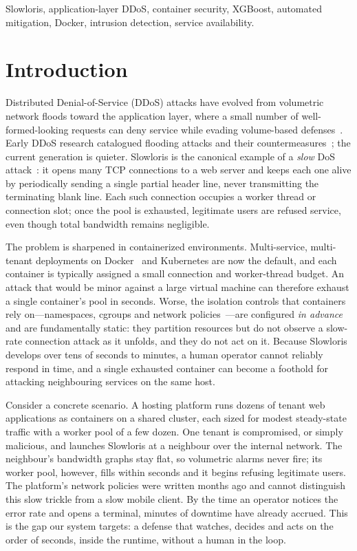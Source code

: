 \documentclass[conference]{IEEEtran}
\begin{document}
\begin{IEEEkeywords}
Slowloris, application-layer DDoS, container security, XGBoost, automated
mitigation, Docker, intrusion detection, service availability.
\end{IEEEkeywords}

\section{Introduction}
Distributed Denial-of-Service (DDoS) attacks have evolved from volumetric
network floods toward the application layer, where a small number of
well-formed-looking requests can deny service while evading volume-based
defenses~\cite{deressu2026survey,praseed2019survey,zargar2013survey}. Early DDoS
research catalogued flooding attacks and their
countermeasures~\cite{mirkovic2004taxonomy,zargar2013survey}; the current
generation is quieter. Slowloris is the canonical example of a \emph{slow} DoS
attack~\cite{cambiaso2013slow}: it opens many TCP connections to a web server
and keeps each one alive by periodically sending a single partial header line,
never transmitting the terminating blank line. Each such connection occupies a
worker thread or connection slot; once the pool is exhausted, legitimate users
are refused service, even though total bandwidth remains negligible.

The problem is sharpened in containerized environments. Multi-service,
multi-tenant deployments on Docker~\cite{merkel2014docker} and Kubernetes are now
the default, and each container is typically assigned a small connection and
worker-thread budget. An attack that would be minor against a large virtual
machine can therefore exhaust a single container's pool in seconds. Worse, the
isolation controls that containers rely on---namespaces, cgroups and network
policies~\cite{k8s_netpol}---are configured \emph{in advance} and are
fundamentally static: they partition resources but do not observe a slow-rate
connection attack as it unfolds, and they do not act on it. Because Slowloris
develops over tens of seconds to minutes, a human operator cannot reliably
respond in time, and a single exhausted container can become a foothold for
attacking neighbouring services on the same host.

Consider a concrete scenario. A hosting platform runs dozens of tenant web
applications as containers on a shared cluster, each sized for modest steady-state
traffic with a worker pool of a few dozen. One tenant is compromised, or simply
malicious, and launches Slowloris at a neighbour over the internal network. The
neighbour's bandwidth graphs stay flat, so volumetric alarms never fire; its worker
pool, however, fills within seconds and it begins refusing legitimate users. The
platform's network policies were written months ago and cannot distinguish this
slow trickle from a slow mobile client. By the time an operator notices the error
rate and opens a terminal, minutes of downtime have already accrued. This is the
gap our system targets: a defense that watches, decides and acts on the order of
seconds, inside the runtime, without a human in the loop.
\end{document}
